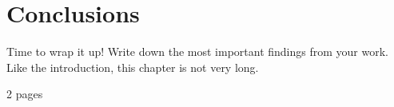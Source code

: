 
\chapter{Conclusions}
\label{chapter:conclusions}

Time to wrap it up! 
Write down the most important findings from your work. 
Like the introduction, this chapter is not very long.

2 pages 
